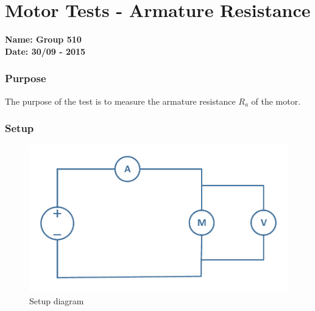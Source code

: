 \pagebreak
\section{Motor Tests - Armature Resistance} \label{app:motorTestArmatureResistance}
\textbf{Name: Group 510}\\
\textbf{Date: 30/09 - 2015}

\subsubsection{Purpose}
The purpose of the test is to measure the armature resistance $R_a$ of the motor.

\subsubsection{Setup}
\begin{figure}[H]
  \centering
	\includegraphics[scale=0.5]{figures/MotorTest1.pdf}
	\caption{Setup diagram}
\end{figure}

